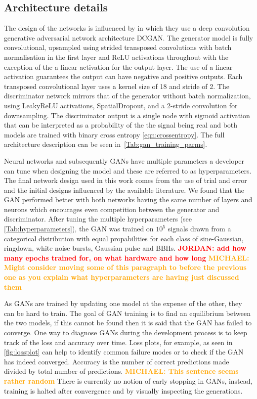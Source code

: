 \documentclass[12pt]{iopart}
\newcommand{\jordan}[1]{\textbf{\textcolor{red}{JORDAN: #1}}}
\newcommand{\michael}[1]{\textbf{\textcolor{orange}{MICHAEL: #1}}}
\begin{document}
\subsection{Architecture details}
%
%
The design of the networks is influenced by \cite{Radford2015} in which they use a deep convolution generative adversarial network architecture \ac{DCGAN}. The generator model is fully convolutional,
upsampled using strided transposed convolutions
with batch normalisation in the
first layer and ReLU activations throughout with the exception of the a linear activation for
the output layer. The use of a linear activation guarantees the output can have negative and positive outputs. Each transposed
convolutional layer uses a kernel size of 18 and stride of 2. The discriminator network
mirrors that of the generator without batch normalization, using
LeakyReLU activations, SpatialDropout, and a 2-stride convolution for
downsampling. The discriminator output is a single node with sigmoid activation that can be interpreted as a probability of the the signal being real and both models are trained with binary cross
entropy \cref{eqn:crossentropy}. The full architecture description can be seen in~\cref{Tab:gan_training_parms}.


%
Neural networks and subsequently \acp{GAN} have multiple parameters a developer
can tune when designing the model and these are referred to as hyperparameters.
The final network design used in this work comes from the use of trial and
error and the initial designs influenced by the available literature. We found
that the \ac{GAN} performed better with both networks having the same number of
layers and neurons which encourages even
competition between the generator and discriminator.  After tuning the multiple
hyperparameters (see \cref{Tab:hyperparameters}), the \ac{GAN} was trained on
$10^5$ signals  drawn from a categorical
distribution with equal propabilities for each class of
sine-Gaussian,
ringdown, white noise bursts, Gaussian pulse and \acp{BBH}. \jordan{add how many epochs trained for, on what hardware and how long} \michael{Might consider moving some of this paragraph to before the previous one as you explain what hyperparameters are having just discussed them}

As \acp{GAN} are trained by updating one model at the expense of the other, they can be hard to train. The goal of GAN training is to find an equilibrium between the two models, if this cannot be found then it is said that the \ac{GAN} has failed to converge. One way to diagnose \acp{GAN} during the development process is to keep track of the loss and accuracy over time. Loss plots, for example, as seen in \cref{fig:lossplot} can help to identify common failure modes or to check if the \ac{GAN} has indeed converged. Accuracy is the number of correct predictions made divided by total number of predictions. \michael{This sentence seems rather random} There is currently no notion of early stopping in \acp{GAN}, instead, training is halted after convergence and by visually inspecting the generations. 
\end{document}
